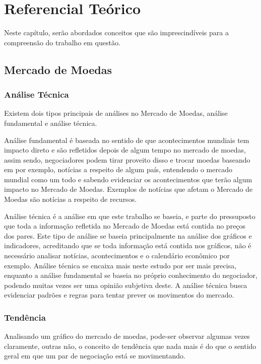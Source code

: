 \chapter[Referencial Teórico]{Referencial Teórico}

Neste capítulo, serão abordados conceitos que são imprescindíveis para a compreensão do trabalho em questão.

\section{Mercado de Moedas}

\subsection{Análise Técnica}
Existem dois tipos principais de análises no Mercado de Moedas, análise fundamental e análise técnica.

Análise fundamental é baseada no sentido de que acontecimentos mundiais tem impacto direto e são refletidos depois de algum tempo no mercado de moedas, assim sendo,
negociadores podem tirar proveito disso e trocar moedas baseando em por exemplo, notícias a respeito de algum país, entendendo o mercado
mundial como um todo e sabendo evidenciar os acontecimentos que terão algum impacto no Mercado de Moedas. Exemplos de notícias que afetam
o Mercado de Moedas são notícias a respeito de recursos.

Análise técnica é a análise em que este trabalho se baseia, e parte do pressuposto que toda a informação refletida no Mercado de Moedas está
contida no preços dos pares. Este tipo de análise se baseia principalmente na análise dos gráficos e indicadores, acreditando que se toda
informação está contida nos gráficos, não é necessário analisar notícias, acontecimentos e o calendário econômico por exemplo. Análise técnica
se encaixa mais neste estudo por ser mais precisa, enquanto a análise fundamental se baseia no próprio conhecimento do negociador, podendo muitas
vezes ser uma opinião subjetiva deste. A análise técnica busca evidenciar padrões e regras para tentar prever os movimentos do mercado.

\subsection{Tendência}

Analisando um gráfico do mercado de moedas, pode-ser observar algumas vezes claramente, outras não, o conceito de tendência que nada mais é
do que o sentido geral em que um par de negociação está se movimentando.

